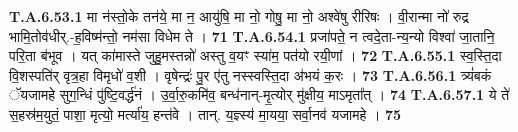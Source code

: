 \documentclass[17pt]{extarticle}
\begin{document}
                  \newline
                                                         \textbf{} \newline \newline
                                \textbf{ T.A.6.53.1} \newline
                  मा न॑स्तो॒के तन॑ये॒ मा न॒ आयु॑षि॒ मा नो॒ गोषु॒ मा नो॒ अश्वे॑षु रीरिषः । वी॒रान्मा नो॑ रुद्र भामि॒तोव॑धीर्.-ह॒विष्म॑न्तो॒ नम॑सा विधेम ते । \textbf{ 71} \newline
                  \newline
                                                         \textbf{} \newline \newline
                                \textbf{ T.A.6.54.1} \newline
                  प्रजा॑पते॒ न त्वदे॒ता-न्य॒न्यो विश्वा॑ जा॒तानि॒ परि॒ता ब॑भूव । यत् का॑मास्ते जुहु॒मस्तन्नो॑ अस्तु व॒यꣳ स्या॑म॒ पत॑यो रयी॒णां । \textbf{ 72} \newline
                  \newline
                                                         \textbf{} \newline \newline
                                \textbf{ T.A.6.55.1} \newline
                  स्व॒स्ति॒दा वि॒शस्पति॑र् वृत्र॒हा विमृधो॑ व॒शी ।  वृषेन्द्रः॑ पु॒र ए॑तु नस्स्वस्ति॒दा अ॑भयं क॒रः । \textbf{ 73} \newline
                  \newline
                                                         \textbf{} \newline \newline
                                \textbf{ T.A.6.56.1} \newline
                  त्र्यं॑बकं ॅयजामहे सुग॒न्धिं पु॑ष्टि॒वर्द्ध॑नं । उ॒र्वा॒रु॒कमि॑व॒ बन्ध॑नान्-मृ॒त्योर् मु॑क्षीय॒ माऽमृता᳚त् । \textbf{ 74} \newline
                  \newline
                                                         \textbf{} \newline \newline
                                \textbf{ T.A.6.57.1} \newline
                  ये ते॑ स॒हस्र॑म॒युतं॒ पाशा॒ मृत्यो॒ मर्त्या॑य॒ हन्त॑वे । तान्. य॒ज्ञ्स्य॑ मा॒यया॒ सर्वा॒नव॑ यजामहे । \textbf{ 75} \newline
\end{document}
